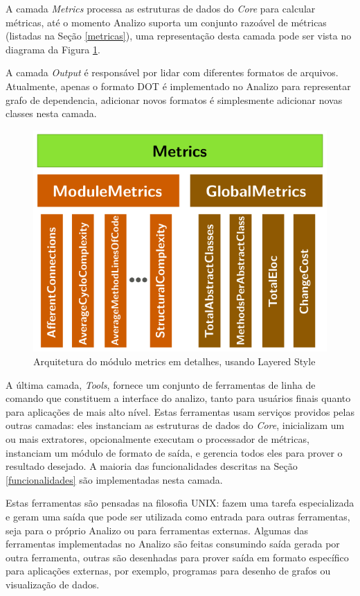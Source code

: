 A camada {\it Metrics} processa as estruturas de dados do {\it Core} para
calcular métricas, até o momento Analizo suporta um conjunto razoável de
métricas (listadas na Seção \ref{metricas}), uma representação desta camada
pode ser vista no diagrama da Figura \ref{arquitetura-metrics-analizo}.

A camada {\it Output} é responsável por lidar com diferentes formatos de
arquivos.  Atualmente, apenas o formato DOT é implementado no Analizo para
representar grafo de dependencia, adicionar novos formatos é simplesmente
adicionar novas classes nesta camada.

\begin{figure}[H]
\center
\includegraphics[scale=0.4]{imagens/analizo-metrics-architecture.png}
\caption{Arquitetura do módulo metrics em detalhes, usando Layered Style \cite{Clements2002}}
\label{arquitetura-metrics-analizo}
\end{figure}

A última camada, {\it Tools}, fornece um conjunto de ferramentas de linha de comando que
constituem a interface do analizo, tanto para usuários finais quanto para
aplicações de mais alto nível. Estas ferramentas usam serviços providos pelas
outras camadas: eles instanciam as estruturas de dados do {\it Core},
inicializam um ou mais extratores, opcionalmente executam o processador de
métricas, instanciam um módulo de formato de saída, e gerencia todos eles para
prover o resultado desejado. A maioria das funcionalidades descritas na Seção
\ref{funcionalidades} são implementadas nesta camada.

Estas ferramentas são pensadas na filosofia UNIX: fazem uma tarefa
especializada e geram uma saída que pode ser utilizada como entrada para outras
ferramentas, seja para o próprio Analizo ou para ferramentas externas. Algumas
das ferramentas implementadas no Analizo são feitas consumindo saída gerada por
outra ferramenta, outras são desenhadas para prover saída em formato específico
para aplicações externas, por exemplo, programas para desenho de grafos ou
visualização de dados.

